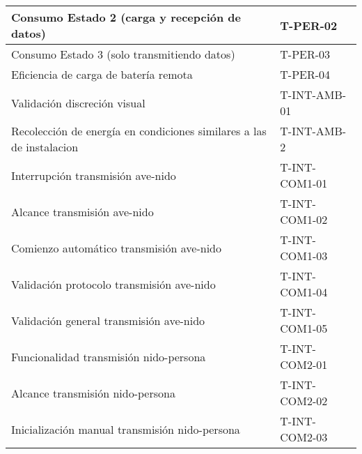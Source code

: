 \begin{table}[H]
\begin{tabular}{|l|l|}
Consumo Estado 2 (carga y recepción de datos)                                                                        & T-PER-02                                  \\ \hline
Consumo Estado 3 (solo transmitiendo datos)                                                                          & T-PER-03                                  \\ \hline
Eficiencia de carga de batería remota                                                                                & T-PER-04                                  \\ \hline
Validación discreción visual                                                                                         & T-INT-AMB-01                              \\ \hline
Recolección de energía en condiciones similares a las de instalacion                                                 & T-INT-AMB-2                               \\ \hline
Interrupción transmisión ave-nido                                                                                    & T-INT-COM1-01                             \\ \hline
Alcance transmisión ave-nido                                                                                         & T-INT-COM1-02                             \\ \hline
Comienzo automático transmisión ave-nido                                                                             & T-INT-COM1-03                             \\ \hline
Validación protocolo transmisión ave-nido                                                                            & T-INT-COM1-04                             \\ \hline
Validación general transmisión ave-nido                                                                              & T-INT-COM1-05                             \\ \hline
Funcionalidad transmisión nido-persona                                                                               & T-INT-COM2-01                             \\ \hline
Alcance transmisión nido-persona                                                                                     & T-INT-COM2-02                             \\ \hline
Inicialización manual transmisión nido-persona                                                                       & T-INT-COM2-03                             \\ \hline

\end{tabular}
\end{table}
